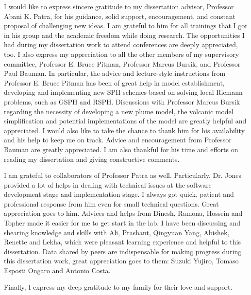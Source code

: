 
I would like to express sincere gratitude to my dissertation advisor, Professor Abani K. Patra, for his guidance, solid support, encouragement, and constant proposal of challenging new ideas. I am grateful to him for all trainings that I got in his group and the academic freedom while doing research. The opportunities I had during my dissertation work to attend conferences are deeply appreciated, too.
I also express my appreciation to all the other members of my supervisory committee, Professor E. Bruce Pitman, Professor Marcus Bursik, and Professor Paul Bauman. In particular, the advice and lecture-style instructions from Professor E. Bruce Pitman has been of great help in model establishment, developing and implementing new SPH schemes based on solving local Riemann problems, such as GSPH and RSPH. Discussions with Professor Marcus Bursik regarding the necessity of developing a new plume model, the volcanic model simplification and potential implementations of the model are greatly helpful and appreciated. I would also like to take the chance to thank him for his availability and his help to keep me on track. Advice and encouragement from Professor Bauman are greatly appreciated. I am also thankful for his time and efforts on reading my dissertation and giving constructive comments. 

I am grateful to collaborators of Professor Patra as well. Particularly, Dr. Jones provided a lot of helps in dealing with technical issues at the software development stage and implementation stage. I always got quick, patient and professional response from him even for small technical questions. Great appreciation goes to him. Advices and helps from Dinesh, Ramona, Hossein and Topher made it easier for me to get start in the lab. I have been discussing and shearing knowledge and skills with Ali, Prashant, Qingyuan Yang, Abishek, Renette and Lekha, which were pleasant learning experience and helpful to this dissertation. Data shared by peers are indispensable for making progress during this dissertation work, great appreciation goes to them: Suzuki Yujiro, Tomaso Esposti Ongaro and Antonio Costa.

Finally, I express my deep gratitude to my family for their love and support.